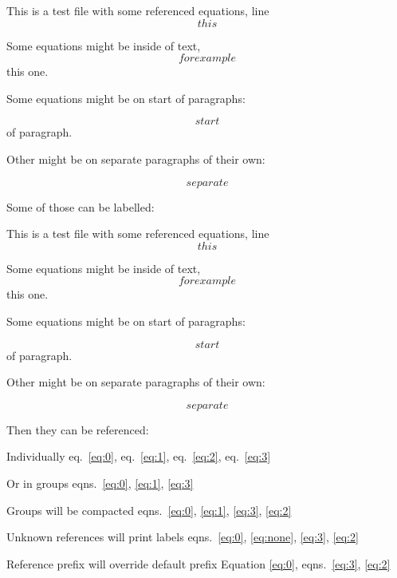This is a test file with some referenced equations, line \[ this \]

Some equations might be inside of text, \[ for example \] this one.

Some equations might be on start of paragraphs:

\[ start \] of paragraph.

Other might be on separate paragraphs of their own:

\[ separate \]

Some of those can be labelled:

This is a test file with some referenced equations, line
\begin{equation} this \label{eq:0}\end{equation}

Some equations might be inside of text,
\begin{equation} for example \label{eq:1}\end{equation} this one.

Some equations might be on start of paragraphs:

\begin{equation} start \label{eq:2}\end{equation} of paragraph.

Other might be on separate paragraphs of their own:

\begin{equation} separate \label{eq:3}\end{equation}

Then they can be referenced:

Individually eq.~\ref{eq:0}, eq.~\ref{eq:1}, eq.~\ref{eq:2},
eq.~\ref{eq:3}

Or in groups eqns.~\ref{eq:0}, \ref{eq:1}, \ref{eq:3}

Groups will be compacted
eqns.~\ref{eq:0}, \ref{eq:1}, \ref{eq:3}, \ref{eq:2}

Unknown references will print labels
eqns.~\ref{eq:0}, \ref{eq:none}, \ref{eq:3}, \ref{eq:2}

Reference prefix will override default prefix Equation \ref{eq:0},
eqns.~\ref{eq:3}, \ref{eq:2}
